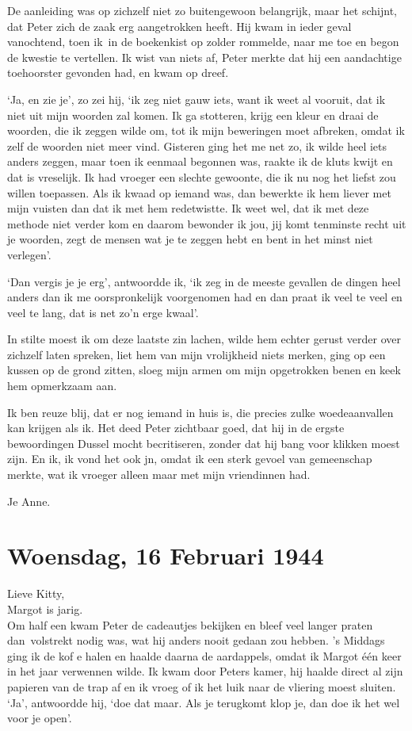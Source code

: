 \documentclass{book}
\begin{document}
De aanleiding was op zichzelf niet zo buitengewoon belangrijk, maar het
schijnt, dat Peter zich de zaak erg aangetrokken heeft. Hij kwam in
ieder geval vanochtend, toen ik~in de boekenkist op zolder rommelde,
naar me toe en begon de kwestie te vertellen. Ik wist van niets af,
Peter merkte dat hij een aandachtige toehoorster gevonden had, en kwam
op dreef.

`Ja, en zie je', zo zei hij, `ik zeg niet gauw iets, want ik weet al
vooruit, dat ik niet uit mijn woorden zal komen. Ik ga stotteren, krijg
een kleur en draai de woorden, die ik zeggen wilde om, tot ik mijn
beweringen moet afbreken, omdat ik zelf de woorden niet meer vind.
Gisteren ging het me net zo, ik wilde heel iets anders zeggen, maar toen
ik eenmaal begonnen was, raakte ik de kluts kwijt en dat is vreselijk.
Ik had vroeger een slechte gewoonte, die ik nu nog het liefst zou willen
toepassen. Als ik kwaad op iemand was, dan bewerkte ik hem liever met
mijn vuisten dan dat ik met hem redetwistte. Ik weet wel, dat ik met
deze methode niet verder kom en daarom bewonder ik jou, jij komt
tenminste recht uit je woorden, zegt de mensen wat je te zeggen hebt en
bent in het minst niet verlegen'.

`Dan vergis je je erg', antwoordde ik, `ik zeg in de meeste gevallen de
dingen heel anders dan ik me oorspronkelijk voorgenomen had en dan praat
ik veel te veel en veel te lang, dat is net zo'n erge kwaal'.

In stilte moest ik om deze laatste zin lachen, wilde hem echter gerust
verder over zichzelf laten spreken, liet hem van mijn vrolijkheid niets
merken, ging op een kussen op de grond zitten, sloeg mijn armen om mijn
opgetrokken benen en keek hem opmerkzaam aan.

Ik ben reuze blij, dat er nog iemand in huis is, die precies zulke
woedeaanvallen kan krijgen als ik. Het deed Peter zichtbaar goed, dat
hij in de ergste bewoordingen Dussel mocht becritiseren, zonder dat hij
bang voor klikken moest zijn. En ik, ik vond het ook jn, omdat ik een
sterk gevoel van gemeenschap merkte, wat ik vroeger alleen maar met mijn
vriendinnen had.

Je Anne.

\chapter{Woensdag, 16 Februari 1944}

Lieve Kitty,\\Margot is jarig.\\Om half een kwam Peter de cadeautjes
bekijken en bleef veel langer praten dan~volstrekt nodig was, wat hij
anders nooit gedaan zou hebben. 's Middags ging ik de kof e halen en
haalde daarna de aardappels, omdat ik Margot één keer in het jaar
verwennen wilde. Ik kwam door Peters kamer, hij haalde direct al zijn
papieren van de trap af en ik vroeg of ik het luik naar de vliering
moest sluiten. `Ja', antwoordde hij, `doe dat maar. Als je terugkomt
klop je, dan doe ik het wel voor je open'.
\end{document}
